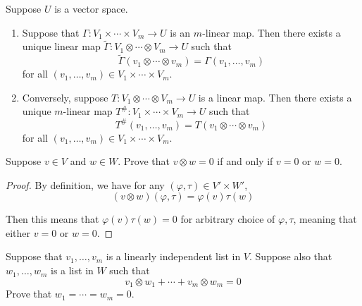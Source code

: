 \documentclass{extarticle}
\begin{document}
\begin{thm}
    Suppose \(U\) is a vector space. 

    \begin{enumerate}[label=(\alph*)]
        \item Suppose that \(\Gamma \colon V_1 \times \cdots \times V_m \to U\) is an \(m\)-linear map. 
        Then there exists a unique linear map \(\tilde{\Gamma} \colon V_1 \otimes \cdots \otimes V_m \to U\) 
        such that 
        \[\tilde{\Gamma}(v_1 \otimes \cdots \otimes v_m) = \Gamma(v_1, \ldots, v_m)\]
        for all \((v_1, \ldots, v_m) \in V_1 \times \cdots \times V_m\).
        
        \item Conversely, suppose \(T \colon V_1 \otimes \cdots \otimes V_m \to U\) is a linear map. 
        Then there exists a unique \(m\)-linear map \(T^{\#} \colon V_1 \times \cdots \times V_m \to U\)
        such that 
        \[T^\# (v_1, \ldots, v_m) = T(v_1 \otimes \cdots \otimes v_m)\]
        for all \((v_1, \ldots, v_m) \in V_1 \times \cdots \times V_m\). 
    \end{enumerate}
\end{thm}


\newpage 
{}

\begin{problem}{1}
    Suppose \(v \in V\) and \(w \in W\). Prove that \(v \otimes w = 0\) if and only if 
    \(v = 0\) or \(w = 0\).
\end{problem}

\begin{proof}
By definition, we have for any \((\varphi, \tau) \in V' \times W'\), 
\[(v \otimes w) (\varphi, \tau) = \varphi (v) \tau(w)\]

Then this means that \(\varphi(v) \tau(w) = 0\) for arbitrary choice of \(\varphi, \tau\), meaning 
that either \(v = 0\) or \(w = 0\).
\end{proof}

\begin{problem}{3}
    Suppose that \(v_1, \ldots, v_m\) is a linearly independent list in \(V\). Suppose also 
    that \(w_1, \ldots, w_m\) is a list in \(W\) such that 
    \[v_1 \otimes w_1 + \cdots + v_m \otimes w_m = 0\]
    Prove that \(w_1 = \cdots = w_m = 0\).
\end{problem}
\end{document}
